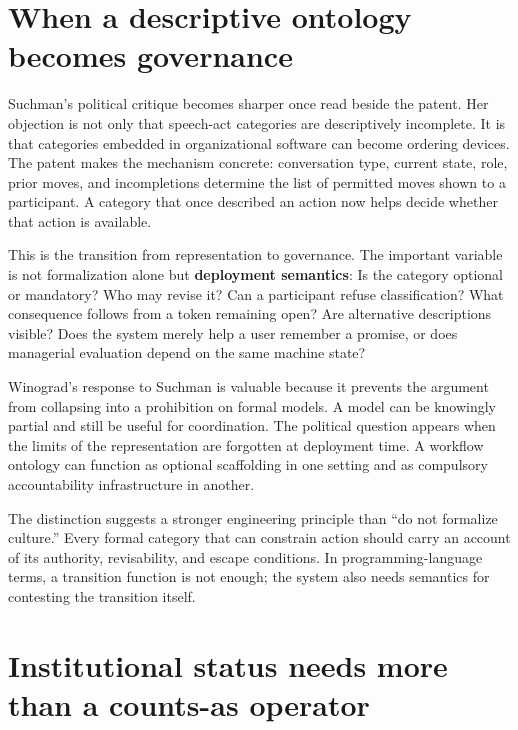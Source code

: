 \documentclass[11pt]{article}
\begin{document}
\section{When a descriptive ontology becomes governance}

Suchman's political critique becomes sharper once read beside the patent. Her objection is not only that speech-act categories are descriptively incomplete. It is that categories embedded in organizational software can become ordering devices. The patent makes the mechanism concrete: conversation type, current state, role, prior moves, and incompletions determine the list of permitted moves shown to a participant. A category that once described an action now helps decide whether that action is available. \cite{suchman1993categories,flores1993conversation}\par

This is the transition from representation to governance. The important variable is not formalization alone but \textbf{deployment semantics}: Is the category optional or mandatory? Who may revise it? Can a participant refuse classification? What consequence follows from a token remaining open? Are alternative descriptions visible? Does the system merely help a user remember a promise, or does managerial evaluation depend on the same machine state?\par

Winograd's response to Suchman is valuable because it prevents the argument from collapsing into a prohibition on formal models. A model can be knowingly partial and still be useful for coordination. The political question appears when the limits of the representation are forgotten at deployment time. A workflow ontology can function as optional scaffolding in one setting and as compulsory accountability infrastructure in another. \cite{winograd1994categories,suchman1995speech}\par

The distinction suggests a stronger engineering principle than “do not formalize culture.” Every formal category that can constrain action should carry an account of its authority, revisability, and escape conditions. In programming-language terms, a transition function is not enough; the system also needs semantics for contesting the transition itself.\par

\section{Institutional status needs more than a counts-as operator}
\end{document}
